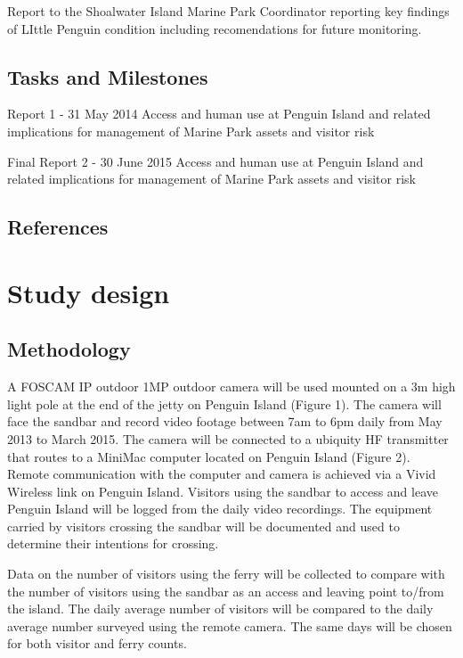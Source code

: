 \documentclass[version=last,
    paper=a4,                               %
    10pt,                                   %
    dvipsnames,
    oneside,                              %
    headings=openany,                       %
    open=any,
    BCOR=7mm,                               %
    DIV=15,     %
]{scrbook}
\begin{document}
Report to the Shoalwater Island Marine Park Coordinator reporting key
findings of LIttle Penguin condition including recomendations for future
monitoring.




\subsection*{Tasks and Milestones}

Report 1 - 31 May 2014 Access and human use at Penguin Island and
related implications for management of Marine Park assets and visitor
risk

Final Report 2 - 30 June 2015 Access and human use at Penguin Island and
related implications for management of Marine Park assets and visitor
risk




\subsection*{References}





\section*{Study design}


\subsection*{Methodology}

A FOSCAM IP outdoor 1MP outdoor camera will be used mounted on a 3m high
light pole at the end of the jetty on Penguin Island (Figure 1). The
camera will face the sandbar and record video footage between 7am to 6pm
daily from May 2013 to March 2015. The camera will be connected to a
ubiquity HF transmitter that routes to a MiniMac computer located on
Penguin Island (Figure 2). Remote communication with the computer and
camera is achieved via a Vivid Wireless link on Penguin Island. Visitors
using the sandbar to access and leave Penguin Island will be logged from
the daily video recordings. The equipment carried by visitors crossing
the sandbar will be documented and used to determine their intentions
for crossing.

Data on the number of visitors using the ferry will be collected to
compare with the number of visitors using the sandbar as an access and
leaving point to/from the island. The daily average number of visitors
will be compared to the daily average number surveyed using the remote
camera. The same days will be chosen for both visitor and ferry counts.
\end{document}
